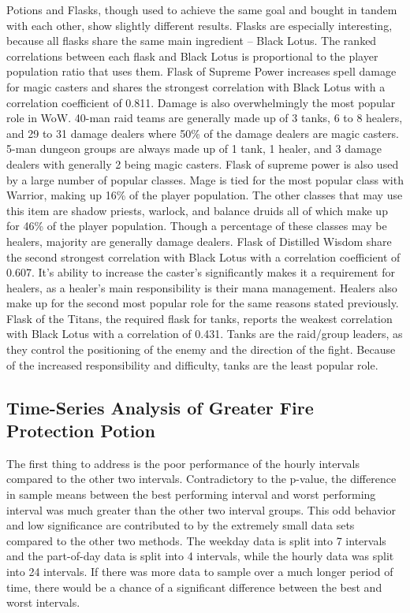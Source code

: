\documentclass[sigconf]{acmart}
\begin{document}
Potions and Flasks, though used to achieve the same goal and bought in tandem with each other, show slightly different results. Flasks are especially interesting, because all flasks share the same main ingredient – Black Lotus. The ranked correlations between each flask and Black Lotus is proportional to the player population ratio that uses them. Flask of Supreme Power increases spell damage for magic casters and shares the strongest correlation with Black Lotus with a correlation coefficient of 0.811. Damage is also overwhelmingly the most popular role in WoW. 40-man raid teams are generally made up of 3 tanks, 6 to 8 healers, and 29 to 31 damage dealers where 50\% of the damage dealers are magic casters. 5-man dungeon groups are always made up of 1 tank, 1 healer, and 3 damage dealers with generally 2 being magic casters. Flask of supreme power is also used by a large number of popular classes. Mage is tied for the most popular class with Warrior, making up 16\% of the player population. The other classes that may use this item are shadow priests, warlock, and balance druids all of which make up for 46\% of the player population. Though a percentage of these classes may be healers, majority are generally damage dealers. Flask of Distilled Wisdom share the second strongest correlation with Black Lotus with a correlation coefficient of 0.607. It’s ability to increase the caster’s significantly makes it a requirement for healers, as a healer’s main responsibility is their mana management. Healers also make up for the second most popular role for the same reasons stated previously. Flask of the Titans, the required flask for tanks, reports the weakest correlation with Black Lotus with a correlation of 0.431. Tanks are the raid/group leaders, as they control the positioning of the enemy and the direction of the fight. Because of the increased responsibility and difficulty, tanks are the least popular role.


\subsection{Time-Series Analysis of Greater Fire Protection Potion}

The first thing to address is the poor performance of the hourly intervals compared to the other two intervals. Contradictory to the p-value, the difference in sample means between the best performing interval and worst performing interval was much greater than the other two interval groups. This odd behavior and low significance are contributed to by the extremely small data sets compared to the other two methods. The weekday data is split into 7 intervals and the part-of-day data is split into 4 intervals, while the hourly data was split into 24 intervals. If there was more data to sample over a much longer period of time, there would be a chance of a significant difference between the best and worst intervals.
\end{document}
